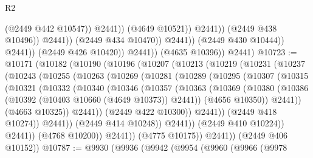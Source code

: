 \begin{lexlean}{R2}
\begin{coremodule}
                                            (@2449 @442 @10547))
                                          @2441))
                                      (@4649 @10521))
                                    @2441))
                                (@2449 @438 @10496))
                              @2441))
                          (@2449 @434 @10470))
                        @2441))
                    (@2449 @430 @10444))
                  @2441))
              (@2449 @426 @10420))
            @2441))
        (@4635 @10396))
      @2441)
@10723 := @10171
    (@10182
      (@10190
        (@10196
          (@10207
            (@10213
              (@10219
                (@10231
                  (@10237
                    (@10243
                      (@10255
                        (@10263
                          (@10269
                            (@10281
                              (@10289
                                (@10295
                                  (@10307
                                    (@10315
                                      (@10321
                                        (@10332
                                          (@10340
                                            (@10346
                                              (@10357
                                                (@10363
                                                  (@10369
                                                    (@10380
                                                      (@10386
                                                        (@10392
                                                          (@10403 @10660 (@4649 @10373))
                                                          @2441))
                                                      (@4656 @10350))
                                                    @2441))
                                                (@4663 @10325))
                                              @2441))
                                          (@2449 @422 @10300))
                                        @2441))
                                    (@2449 @418 @10274))
                                  @2441))
                              (@2449 @414 @10248))
                            @2441))
                        (@2449 @410 @10224))
                      @2441))
                  (@4768 @10200))
                @2441))
            (@4775 @10175))
          @2441))
      (@2449 @406 @10152))
@10787 := @9930
    (@9936
      (@9942
        (@9954
          (@9960
            (@9966
              (@9978

\end{coremodule}
\end{lexlean}

